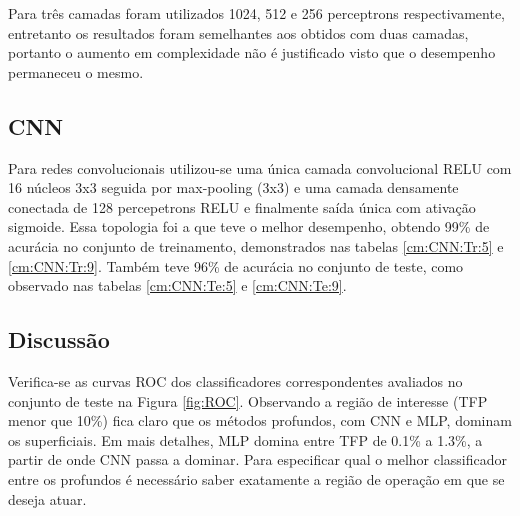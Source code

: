 \begin{table}

\end{table}

Para três camadas foram utilizados 1024, 512 e 256 perceptrons respectivamente, entretanto os resultados foram semelhantes aos obtidos com duas camadas, portanto o aumento em complexidade não é justificado visto que o desempenho permaneceu o mesmo.

\subsection{CNN}
Para redes convolucionais utilizou-se uma única camada convolucional RELU com 16 núcleos 3x3 seguida por max-pooling (3x3) e uma camada densamente conectada de 128 percepetrons RELU e finalmente saída única com ativação sigmoide. Essa topologia foi a que teve o melhor desempenho, obtendo 99\% de acurácia no conjunto de treinamento, demonstrados nas tabelas \ref{cm:CNN:Tr:5} e \ref{cm:CNN:Tr:9}. Também teve 96\% de acurácia no conjunto de teste, como observado nas tabelas \ref{cm:CNN:Te:5} e \ref{cm:CNN:Te:9}.

\begin{table}

\end{table}


\subsection{Discussão}
Verifica-se as curvas ROC dos classificadores correspondentes avaliados no conjunto de teste na Figura \ref{fig:ROC}. Observando a região de interesse (TFP menor que 10\%) fica claro que os métodos profundos, com CNN e MLP, dominam os superficiais. Em mais detalhes, MLP domina entre TFP de 0.1\% a 1.3\%, a partir de onde CNN passa a dominar. Para especificar qual o melhor classificador entre os profundos é necessário saber exatamente a região de operação em que se deseja atuar. 

